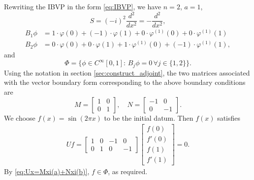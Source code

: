 \documentclass[12pt, oneside, a4paper]{article}
\begin{document}
Rewriting the IBVP in the form \eqref{eq:IBVP}, we have $n=2$, $a=1$,
\[S= (-i)^2 \frac{d^2}{dx^2} = -\frac{d^2}{dx^2},\]
\begin{align*}
B_1\phi &= 1\cdot \varphi(0) + (-1)\cdot \varphi(1) + 0\cdot \varphi^{(1)}(0) + 0\cdot \varphi^{(1)}(1)\\
B_2\phi &= 0\cdot \varphi(0) + 0\cdot \varphi(1) + 1\cdot \varphi^{(1)}(0) + (-1)\cdot \varphi^{(1)}(1),
\end{align*}
and
\[\Phi = \{\phi\in C^{\infty}[0,1]:\, B_j\phi = 0\,\forall j\in\{1,2\}\}.\]
Using the notation in section \ref{sec:construct_adjoint}, the two matrices associated with the vector boundary form corresponding to the above boundary conditions are
$$M = \begin{bmatrix}1&0\\0&1\end{bmatrix},\quad N = \begin{bmatrix}-1&0\\0& -1 \end{bmatrix}.$$
We choose $f(x)=\sin(2\pi x)$ to be the initial datum. Then $f(x)$ satisfies
\begin{align*}
Uf = \begin{bmatrix}
1&0& -1 &0\\
0&1&0& -1
\end{bmatrix} \begin{bmatrix}f(0)\\f'(0)\\f(1)\\f'(1)\end{bmatrix} = 0.
\end{align*}
By \eqref{eq:Ux=Mxi(a)+Nxi(b)}, $f\in \Phi$, as required.
\end{document}
